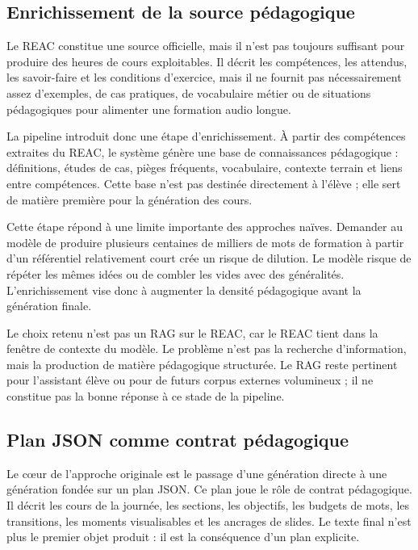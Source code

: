 \subsection{Enrichissement de la source pédagogique}

Le REAC constitue une source officielle, mais il n'est pas toujours suffisant pour produire
des heures de cours exploitables. Il décrit les compétences, les attendus, les savoir-faire
et les conditions d'exercice, mais il ne fournit pas nécessairement assez d'exemples, de
cas pratiques, de vocabulaire métier ou de situations pédagogiques pour alimenter une
formation audio longue.

La pipeline introduit donc une étape d'enrichissement. À partir des compétences extraites
du REAC, le système génère une base de connaissances pédagogique : définitions, études
de cas, pièges fréquents, vocabulaire, contexte terrain et liens entre compétences. Cette
base n'est pas destinée directement à l'élève ; elle sert de matière première pour la
génération des cours.

Cette étape répond à une limite importante des approches naïves. Demander au modèle
de produire plusieurs centaines de milliers de mots de formation à partir d'un référentiel
relativement court crée un risque de dilution. Le modèle risque de répéter les mêmes
idées ou de combler les vides avec des généralités. L'enrichissement vise donc à augmenter
la densité pédagogique avant la génération finale.

Le choix retenu n'est pas un RAG sur le REAC, car le REAC tient dans la fenêtre de
contexte du modèle. Le problème n'est pas la recherche d'information, mais la production
de matière pédagogique structurée. Le RAG reste pertinent pour l'assistant élève ou pour
de futurs corpus externes volumineux ; il ne constitue pas la bonne réponse à ce stade de
la pipeline.

\subsection{Plan JSON comme contrat pédagogique}

Le cœur de l'approche originale est le passage d'une génération directe à une génération
fondée sur un plan JSON. Ce plan joue le rôle de contrat pédagogique. Il décrit les cours
de la journée, les sections, les objectifs, les budgets de mots, les transitions, les moments
visualisables et les ancrages de slides. Le texte final n'est plus le premier objet produit :
il est la conséquence d'un plan explicite.


